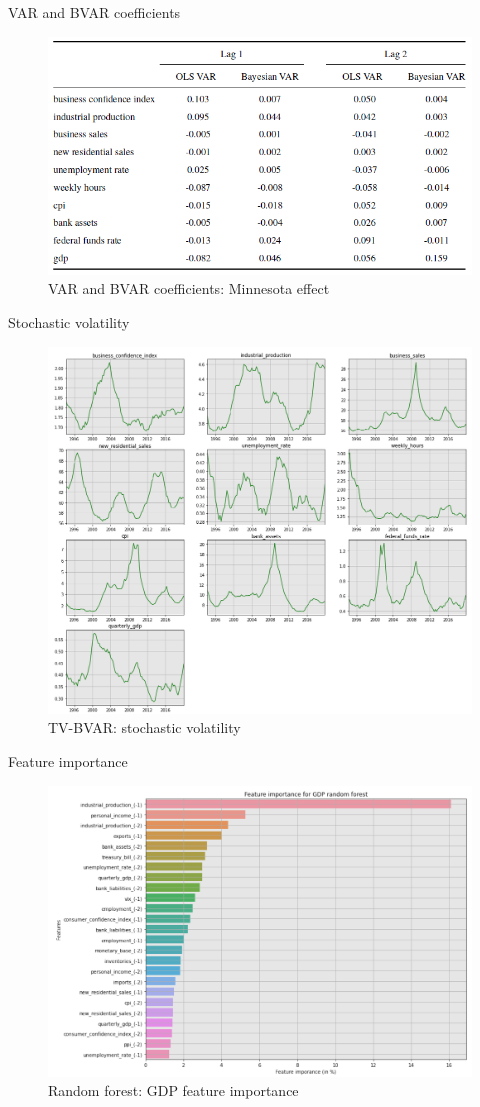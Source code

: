 \begin{frame}{VAR and BVAR coefficients}
\begin{figure}[h]
	\centering
	\includegraphics[width=.9\linewidth]{im11}
	\caption{VAR and BVAR coefficients: Minnesota effect}
	\label{fig_app_4}
\end{figure}
\end{frame}

\begin{frame}{Stochastic volatility}
\begin{figure}[h]
	\centering
	\includegraphics[width=.7\linewidth]{im12}
	\caption{TV-BVAR: stochastic volatility}
	\label{fig_app_5}
\end{figure}
\end{frame}

\begin{frame}{Feature importance}
\begin{figure}[h]
	\centering
	\includegraphics[width=.8\linewidth]{im13}
	\caption{Random forest: GDP feature importance}
	\label{fig_app_6}
\end{figure}
\end{frame}

